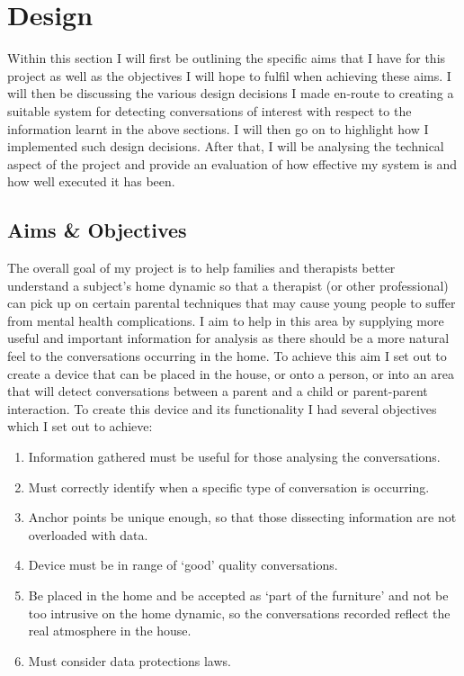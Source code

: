 \documentclass[a4paper,11pt]{report}
\begin{document}
\chapter{Design}
Within this section I will first be outlining the specific aims that I have for this project as well as the objectives I will hope to fulfil when achieving these aims. I will then be discussing the various design decisions I made en-route to creating a suitable system for detecting conversations of interest with respect to the information learnt in the above sections. I will then go on to highlight how I implemented such design decisions. After that, I will be analysing the technical aspect of the project and provide an evaluation of how effective my system is and how well executed it has been.

\section{Aims \& Objectives}
The overall goal of my project is to help families and therapists better understand a subject’s home dynamic so that a therapist (or other professional) can pick up on certain parental techniques that may cause young people to suffer from mental health complications. I aim to help in this area by supplying more useful and important information for analysis as there should be a more natural feel to the conversations occurring in the home. To achieve this aim I set out to create a device that can be placed in the house, or onto a person, or into an area that will detect conversations between a parent and a child or parent-parent interaction. To create this device and its functionality I had several objectives which I set out to achieve:
\begin{enumerate}
\item Information gathered must be useful for those analysing the conversations.
\item Must correctly identify when a specific type of conversation is occurring.
\item Anchor points be unique enough, so that those dissecting information are not overloaded with data.
\item Device must be in range of ‘good’ quality conversations. 
\item Be placed in the home and be accepted as ‘part of the furniture’ and not be too intrusive on the home dynamic, so the conversations recorded reflect the real atmosphere in the house.
\item Must consider data protections laws.
\end{enumerate}
\end{document}
